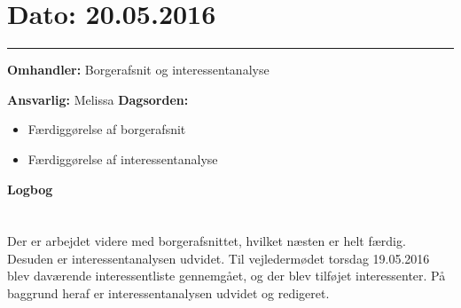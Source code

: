 \section{Dato: 20.05.2016}
\hrule

\textbf{Omhandler:} Borgerafsnit og interessentanalyse

\textbf{Ansvarlig:} Melissa
\textbf{Dagsorden:}
\begin{itemize}
	\item Færdiggørelse af borgerafsnit
	\item Færdiggørelse af interessentanalyse
	
\end{itemize}

\textbf{Logbog}
\\
\\ \\
Der er arbejdet videre med borgerafsnittet, hvilket næsten er helt færdig. Desuden er interessentanalysen udvidet. Til vejledermødet torsdag 19.05.2016 blev daværende interessentliste gennemgået, og der blev tilføjet interessenter. På baggrund heraf er interessentanalysen udvidet og redigeret.
